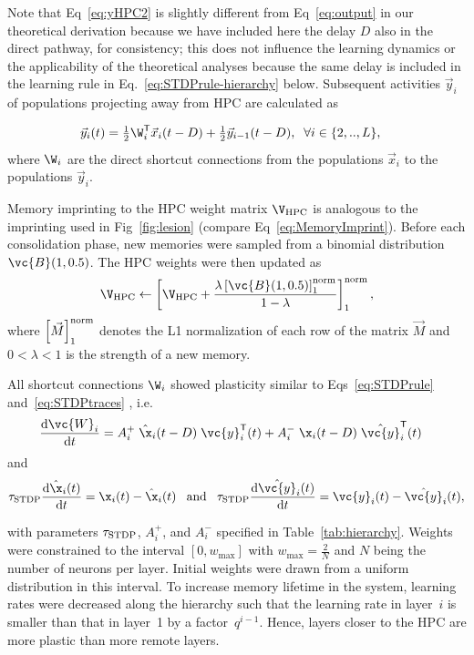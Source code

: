 \noindent
Note that Eq~\eqref{eq:yHPC2} is slightly different from  Eq~\eqref{eq:output} in our theoretical derivation because we have included here the delay $D$ also in the direct pathway, for consistency; this does not influence the learning dynamics or the applicability of the theoretical analyses because the same delay is included in the learning rule in Eq.~\eqref{eq:STDPrule-hierarchy} below. Subsequent activities $\vec{y}_i$ of populations projecting away from HPC are calculated  as

\begin{align}
\vec{y}_{i}(t) &= \tfrac{1}{2} \W_{i}^\mathsf{T} \vec{x}_{i}(t-D) + \tfrac{1}{2} \vec{y}_{i-1}(t-D), \;\; \forall i \in \{2,..,L\},
\end{align}
where $\W_i$ are the direct shortcut connections from the populations $\vec{x}_{i}$ to the populations $\vec{y}_i$.


Memory imprinting to the HPC weight matrix $\V_{\rm HPC}$ is analogous to the imprinting used in Fig~\ref{fig:lesion} (compare Eq~\eqref{eq:MemoryImprint}). Before each consolidation phase, new memories were sampled from a binomial distribution $\vc{B}(1, 0.5)$. The HPC weights were then updated as
\begin{equation}
\V_{\rm HPC} \leftarrow \left[ \V_{\rm HPC} + \frac{\lambda \left[ \vc{B}(1, 0.5)  \right]^{\rm norm}_1 }{1-\lambda}  \right]^{\rm norm}_1,
\label{eq:hierarchy_imprint}
\end{equation}
where $\left[ \vec{M}\right]^{\rm norm}_1$  denotes the L1 normalization of each row of the matrix $\vec{M}$
and $0<\lambda<1$ is the strength of a new memory.

All shortcut connections $\W_{i}$ showed plasticity similar to Eqs~\eqref{eq:STDPrule} and~\eqref{eq:STDPtraces}
, i.e.
\begin{align}
\frac{\mathrm{d} \vc{W}_i }{\mathrm{d} t} &=
A^+_i  \; \hat\x_i(t-D) \; \vc{y}^\mathsf{T}_i(t) + A^-_i \; \x_i(t-D)\; \hat {\vc{y}}^\mathsf{T}_i(t)
\label{eq:STDPrule-hierarchy}
\end{align}
and
\begin{align}
\tau_{\rm STDP} \frac{\mathrm{d} \hat \x_i(t)}{\mathrm{d}t} = \x_i(t) - \hat \x_i(t) \;\;\; \mathrm{and}  \;\;\; \tau_{\rm STDP} \frac{\mathrm{d} \hat {\vc{y}}_i(t)}{\mathrm{d} t} = \vc{y}_i(t) - \hat {\vc{y}}_i(t), \label{eq:STDPtraces-hierarchy}
\end{align}

\noindent
with parameters $\tau_{\rm STDP}$, $A_i^+$, and $A_i^-$ specified in Table~\ref{tab:hierarchy}. Weights were constrained to the interval $[0, w_\textrm{max}]$ with $w_\textrm{max}=\frac{2}{N}$ and $N$ being the number of neurons per layer.
Initial weights were drawn from a uniform distribution in this interval.
To increase memory lifetime in the system, learning rates were decreased along the hierarchy such that the learning rate in layer~$i$ is smaller than that in layer~1 by a factor~$q^{i-1}$. Hence, layers closer to the HPC are more plastic than more remote layers.

